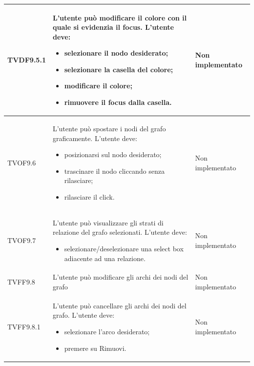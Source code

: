 \documentclass[openany,12pt,a4paper]{report}
\begin{document}
\begin{longtable}{| p{2cm} |p{5cm} | p{2.5cm} |}
	\newline TVDF9.5.1&
	\newline L'utente può modificare il colore con il quale si evidenzia il focus. L'utente deve:
	\begin{itemize}
		\item selezionare il nodo desiderato;
		\item selezionare la casella del colore;
		\item modificare il colore;
		\item rimuovere il focus dalla casella.
	\end{itemize}&
	\newline Non implementato
	\\[1em]
	\hline
	
	\newline TVOF9.6&
	\newline L'utente può spostare i nodi del grafo graficamente. L'utente deve:
	\begin{itemize}
		\item posizionarsi sul nodo desiderato;
		\item trascinare il nodo cliccando senza rilasciare;
		\item rilasciare il click.
	\end{itemize}&
	\newline Non implementato
	\\[1em]
	\hline
	
	\newline TVOF9.7&
	\newline L'utente può visualizzare gli strati di relazione del grafo selezionati. L'utente deve:
	\begin{itemize}
		\item selezionare/deselezionare una select box adiacente ad una relazione.
	\end{itemize}&
	\newline Non implementato
	\\[1em]
	\hline
	
	\newline TVFF9.8&
	\newline L'utente può modificare gli archi dei nodi del grafo&
	\newline Non implementato
	\\[1em]
	\hline
	
	\newline TVFF9.8.1&
	\newline L'utente può cancellare gli archi dei nodi del grafo. L'utente deve:
	\begin{itemize}
		\item selezionare l'arco desiderato;
		\item premere su Rimuovi.
	\end{itemize}&
	\newline Non implementato
	\\[1em]
	\hline
	

\end{longtable}
\end{document}
